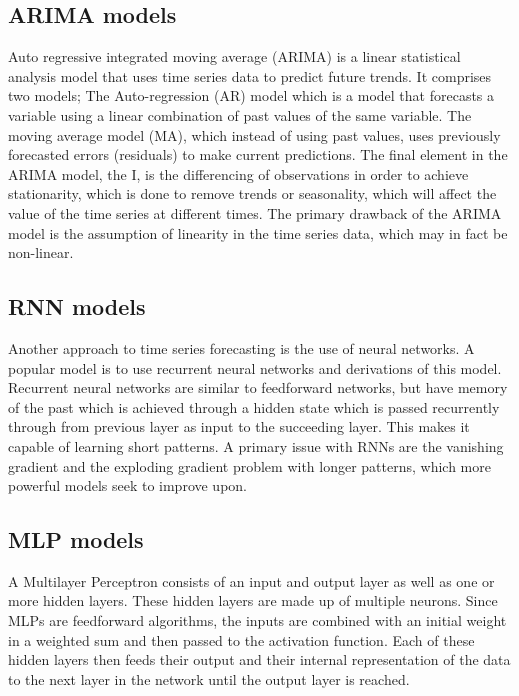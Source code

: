 \subsection{ARIMA models}
Auto regressive integrated moving average (ARIMA) is a linear statistical analysis model that uses time series data to predict future trends. It comprises two models; The Auto-regression (AR) model which is a model that forecasts a variable using a linear combination of past values of the same variable. The moving average model (MA), which instead of using past values, uses previously forecasted errors (residuals) to make current predictions. 
The final element in the ARIMA model, the I, is the differencing of observations in order to achieve stationarity, which is done to remove trends or seasonality, which will affect the value of the time series at different times. The primary drawback of the ARIMA model is the assumption of linearity in the time series data, which may in fact be non-linear.\cite{HybridArimaAndNN}\cite{ForecastinPrinciplesAndPractice}

\subsection{RNN models}
Another approach to time series forecasting is the use of neural networks. A popular model is to use recurrent neural networks and derivations of this model. Recurrent neural networks are similar to feedforward networks, but have memory of the past which is achieved through a hidden state which is passed recurrently through from previous layer as input to the succeeding layer. This makes it capable of learning short patterns. 
A primary issue with RNNs are the vanishing gradient and the exploding gradient problem with longer patterns, which more powerful models seek to improve upon. \cite{AIModernApproach}\cite{hands-onML}

\subsection{MLP models}
A Multilayer Perceptron consists of an input and output layer as well as one or more hidden layers. These hidden layers are made up of multiple neurons. 
Since MLPs are feedforward algorithms, the inputs are combined with an initial weight in a weighted sum and then passed to the activation function. 
Each of these hidden layers then feeds their output and their internal representation of the data to the next layer in the network until the output layer is reached.\cite{bentoMultilayerPerceptronExplained2021}

